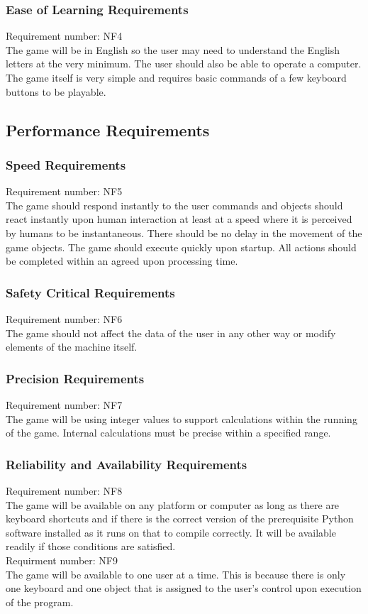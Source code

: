 \documentclass[12pt, titlepage]{article}
\begin{document}
\subsubsection{Ease of Learning Requirements}
Requirement number: NF4
\\The game will be in English so the user may need to understand the English letters at the very minimum. The user should also be able to operate a computer. The game itself is very simple and requires basic commands of a few keyboard buttons to be playable.

\subsection{Performance Requirements}

\subsubsection{Speed Requirements}
Requirement number: NF5
\\The game should respond instantly to the user commands and objects should react instantly upon human interaction at least at a speed where it is perceived by humans to be instantaneous. There should be no delay in the movement of the game objects. The game should execute quickly upon startup. All actions should be completed within an agreed upon processing time. 

\subsubsection{Safety Critical Requirements}
Requirement number: NF6
\\The game should not affect the data of the user in any other way or modify elements of the machine itself. 

\subsubsection{Precision Requirements}
Requirement number: NF7
\\The game will be using integer values to support calculations within the running of the game. Internal calculations must be precise within a specified range. 

\subsubsection{Reliability and Availability Requirements}
Requirement number: NF8
\\The game will be available on any platform or computer as long as there are keyboard shortcuts and if there is the correct version of the prerequisite Python software installed as it runs on that to compile correctly. It will be available readily if those conditions are satisfied. 
\smallskip
\\Requirment number: NF9
\\The game will be available to one user at a time. This is because there is only one keyboard and one object that is assigned to the user's control upon execution of the program. 
\end{document}

